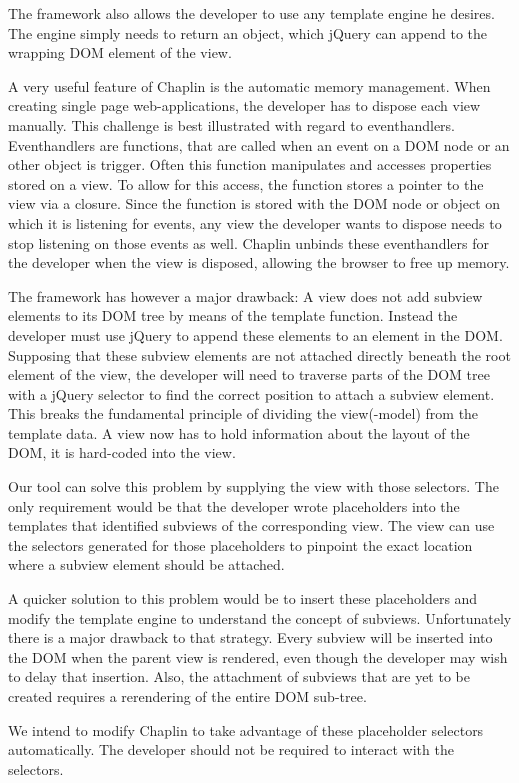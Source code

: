 \documentclass[thesis.tex]{subfiles}
\begin{document}
The framework also allows the developer to use any template engine he desires.
The engine simply needs to return an object, which jQuery can append to the
wrapping DOM element of the view.

A very useful feature of Chaplin is the automatic memory management.
When creating single page web-applications, the developer has to dispose each
view manually. This challenge is best illustrated with regard to eventhandlers.
Eventhandlers are functions, that are called when an event on a DOM node or
an other object is trigger. Often this function manipulates and accesses
properties stored on a view. To allow for this access, the function stores a
pointer to the view via a closure. Since the function is stored with the
DOM node or object on which it is listening for events, any view the developer
wants to dispose needs to stop listening on those events as well.
Chaplin unbinds these eventhandlers for the developer when the view is disposed,
allowing the browser to free up memory.

The framework has however a major drawback: A view does not add subview elements
to its DOM tree by means of the template function. Instead the developer
must use jQuery to append these elements to an element in the DOM.
Supposing that these subview elements are not attached directly beneath the root
element of the view, the developer will need to traverse parts of the DOM tree
with a jQuery selector to find the correct position to attach a subview element.
This breaks the fundamental principle of dividing the view(-model) from the
template data. A view now has to hold information about the layout of the DOM,
it is hard-coded into the view.

Our tool can solve this problem by supplying the view with those selectors.
The only requirement would be that the developer wrote placeholders into the
templates that identified subviews of the corresponding view.
The view can use the selectors generated for those placeholders
to pinpoint the exact location where a subview element should be attached.

A quicker solution to this problem would be to insert these placeholders and
modify the template engine to understand the concept of subviews.
Unfortunately there is a major drawback to that strategy.
Every subview will be inserted into the DOM when the parent view is rendered,
even though the developer may wish to delay that insertion.
Also, the attachment of subviews that are yet to be created requires a
rerendering of the entire DOM sub-tree.

We intend to modify Chaplin to take advantage of these placeholder selectors
automatically. The developer should not be required to interact with the
selectors.




\end{document}
